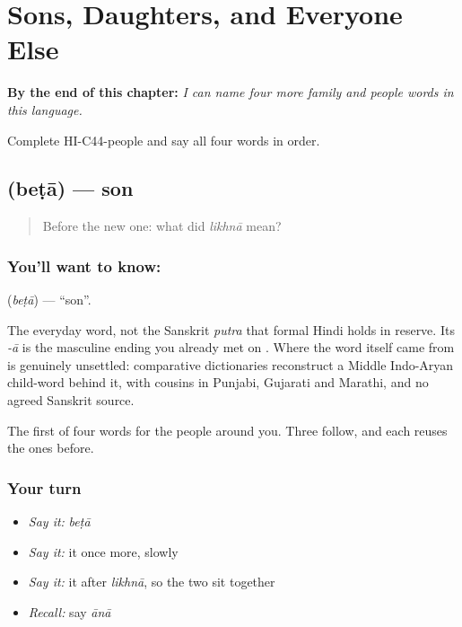 
\chapter{Sons, Daughters, and Everyone Else}
\label{ch:hi-sons-daughters}

\begin{chapteropening}
\textbf{By the end of this chapter:} \emph{I can name four more family and people words in this language.}

Complete HI-C44-people and say all four words in order.
\end{chapteropening}

\section[\texorpdfstring{\hi{बेटा} (beṭā)}{बेटा (beṭā)}]{ (beṭā) — son}

\label{lesson:HI-C44-son}



\begin{quote}
Before the new one: what did \emph{likhnā} mean?
\end{quote}

\subsection*{You'll want to know: }
\textbf{} (\emph{beṭā}) — \textquotedblleft{}son\textquotedblright{}.

The everyday word, not the Sanskrit \emph{putra} that formal Hindi holds in reserve. Its \emph{-ā} is the masculine ending you already met on . Where the word itself came from is genuinely unsettled: comparative dictionaries reconstruct a Middle Indo-Aryan child-word behind it, with cousins in Punjabi, Gujarati and Marathi, and no agreed Sanskrit source.

\begin{grammarlens}[title={What you've built}]
The first of four words for the people around you. Three follow, and each reuses the ones before.
\end{grammarlens}

\subsection*{Your turn}
\begin{itemize}
\raggedright
  \item \emph{Say it:} \emph{beṭā}
  \item \emph{Say it:} it once more, slowly
  \item \emph{Say it:} it after \emph{likhnā}, so the two sit together
  \item \emph{Recall:} say \emph{ānā}
\end{itemize}

